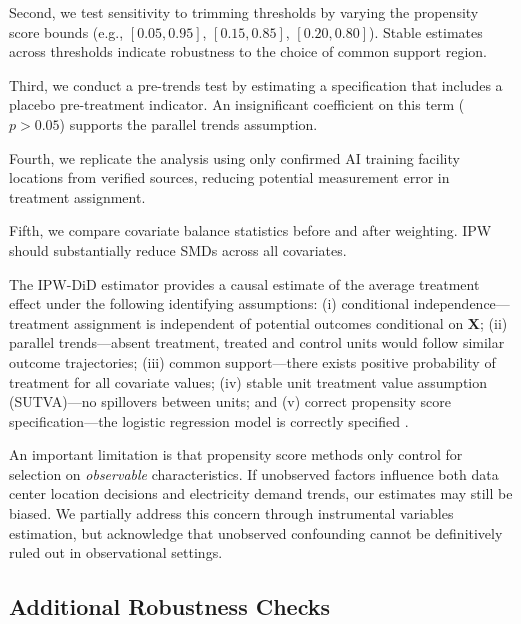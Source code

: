 \documentclass[a4paper,fleqn,longmktitle]{cas-sc}
\theoremstyle{plain}
\theoremstyle{definition}
\begin{document}
Second, we test sensitivity to trimming thresholds by varying the propensity score bounds (e.g., $[0.05, 0.95]$, $[0.15, 0.85]$, $[0.20, 0.80]$). Stable estimates across thresholds indicate robustness to the choice of common support region.

Third, we conduct a pre-trends test by estimating a specification that includes a placebo pre-treatment indicator. An insignificant coefficient on this term ($p > 0.05$) supports the parallel trends assumption.

Fourth, we replicate the analysis using only confirmed AI training facility locations from verified sources, reducing potential measurement error in treatment assignment.

Fifth, we compare covariate balance statistics before and after weighting. IPW should substantially reduce SMDs across all covariates.

The IPW-DiD estimator provides a causal estimate of the average treatment effect under the following identifying assumptions: (i) conditional independence---treatment assignment is independent of potential outcomes conditional on $\mathbf{X}$; (ii) parallel trends---absent treatment, treated and control units would follow similar outcome trajectories; (iii) common support---there exists positive probability of treatment for all covariate values; (iv) stable unit treatment value assumption (SUTVA)---no spillovers between units; and (v) correct propensity score specification---the logistic regression model is correctly specified \citep{abadie2005semiparametric, callaway2021difference}.

An important limitation is that propensity score methods only control for selection on \emph{observable} characteristics. If unobserved factors influence both data center location decisions and electricity demand trends, our estimates may still be biased. We partially address this concern through instrumental variables estimation, but acknowledge that unobserved confounding cannot be definitively ruled out in observational settings.


\subsection{Additional Robustness Checks}\label{App:AdditionalRobustnessChecks}

\end{document}
